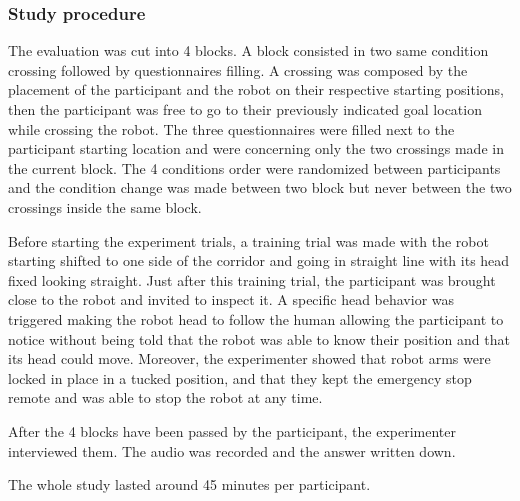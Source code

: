 \documentclass[a4paper,11pt,twoside]{StyleThese}
\begin{document}
\subsubsection{Study procedure}
The evaluation was cut into 4 blocks. A block consisted in two same condition crossing followed by questionnaires filling. A crossing was composed by the placement of the participant and the robot on their respective starting positions, then the participant was free to go to their previously indicated goal location while crossing the robot. The three questionnaires were filled next to the participant starting location and were concerning only the two crossings made in the current block. The 4 conditions order were randomized between participants and the condition change was made between two block but never between the two crossings inside the same block.

Before starting the experiment trials, a training trial was made with the robot starting shifted to one side of the corridor and going in straight line with its head fixed looking straight. Just after this training trial, the participant was brought close to the robot and invited to inspect it. A specific head behavior was triggered making the robot head to follow the human allowing the participant to notice without being told that the robot was able to know their position and that its head could move. Moreover, the experimenter showed that robot arms were locked in place in a tucked position, and that they kept the emergency stop remote and was able to stop the robot at any time.

After the 4 blocks have been passed by the participant, the experimenter interviewed them. The audio was recorded and the answer written down.

The whole study lasted around 45 minutes per participant.
\end{document}
